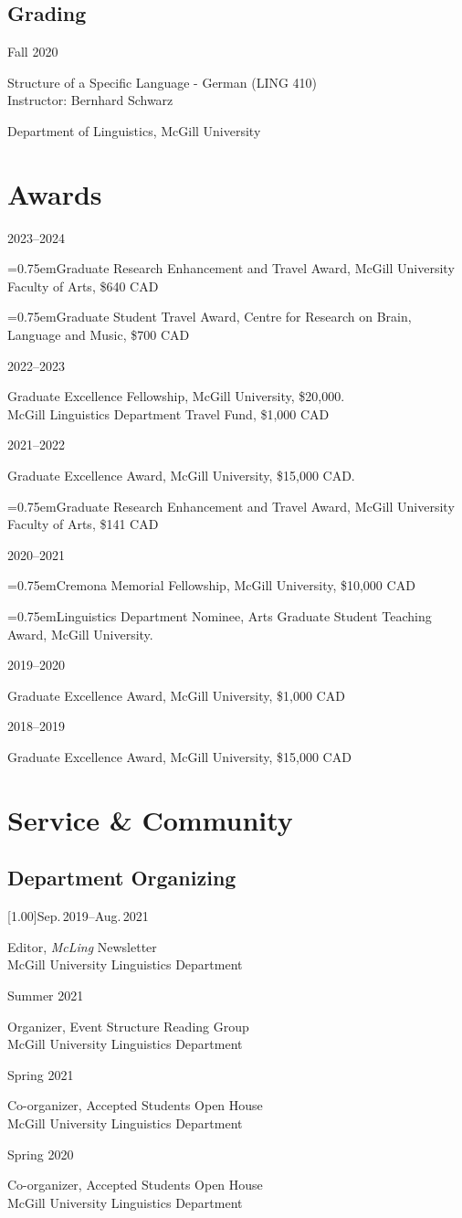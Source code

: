 \documentclass[11pt,oneside,DIV=calc,parskip=off]{scrarticle} %
\newlength{\leftcolwidth}
\newlength{\mycolspace}
\newlength{\rightcolwidth}
\newlength{\spacingbefore}
\newlength{\spacingafter}
\newcommand{\hang}{\hangindent=0.75em\hangafter=1}
\newcommand{\mytwocol}[2]{%
	\vspace{\spacingbefore}%
	\begin{minipage}[t]{\leftcolwidth}%
		\strut#1%
	\end{minipage}%
	\hspace{\mycolspace}%
	\begin{minipage}[t]{\rightcolwidth}%
		\strut#2%
	\end{minipage}%
	\vspace{\spacingafter}\par%
	}
\newcommand{\cvline}[2]{%
	\mytwocol{#1}{#2}%
	}
\begin{document}
\subsection{Grading}
\cvline{Fall 2020}{%
	Structure of a Specific Language - German (LING 410)\\
	Instructor: Bernhard Schwarz\par
	Department of Linguistics, McGill University}

\section{Awards}

\cvline{2023--2024}{\hang Graduate Research Enhancement and Travel Award, McGill University Faculty of Arts, \$640 CAD\par \hang Graduate Student Travel Award, Centre for Research on Brain, Language and Music, \$700 CAD}
\cvline{2022--2023}{Graduate Excellence Fellowship, McGill University, \$20,000.\\McGill Linguistics Department Travel Fund, \$1,000 CAD}
\cvline{2021--2022}{Graduate Excellence Award, McGill University, \$15,000 CAD.\par \hang Graduate Research Enhancement and Travel Award, McGill University Faculty of Arts, \$141 CAD}
\cvline{2020--2021}{\hang Cremona Memorial Fellowship, McGill University, \$10,000 CAD\par \hang Linguistics Department Nominee, Arts Graduate Student Teaching Award, McGill University.}
\cvline{2019--2020}{Graduate Excellence Award, McGill University, \$1,000 CAD}
\cvline{2018--2019}{Graduate Excellence Award, McGill University, \$15,000 CAD}


\section{Service \& Community}

\subsection{Department Organizing}
\cvline{\scalebox{.97}[1.00]{Sep.\,2019--Aug.\,2021}}{Editor, \textit{McLing} Newsletter\\McGill University Linguistics Department}
\cvline{Summer 2021}{Organizer, Event Structure Reading Group\\McGill University Linguistics Department}
\cvline{Spring 2021}{Co-organizer, Accepted Students Open House\\McGill University Linguistics Department}
\cvline{Spring 2020}{Co-organizer, Accepted Students Open House\\McGill University Linguistics Department}
\end{document}
